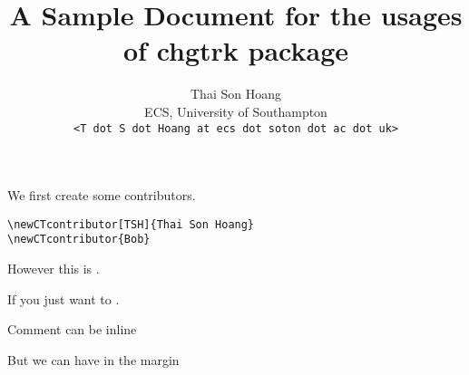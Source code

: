 \usepackage{verbatim}
\title{A Sample Document for the usages of \textsf{chgtrk} package}
\author{Thai Son Hoang\\ECS, University of Southampton\\\texttt{<T dot S dot Hoang at ecs dot soton dot ac dot uk>}}


\maketitle

We first create some contributors.
\begin{verbatim}
\newCTcontributor[TSH]{Thai Son Hoang}
\newCTcontributor{Bob}
\end{verbatim}




However this is .

If you just want to .

Comment can be inline

But we can have  in the margin



